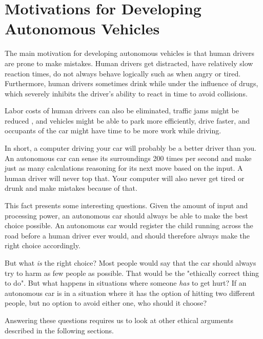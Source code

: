 \section{Motivations for Developing Autonomous Vehicles}
The main motivation for developing autonomous vehicles is that human drivers are prone to make mistakes. Human drivers get distracted, have relatively slow reaction times, do not always behave logically such as when angry or tired. Furthermore, human drivers sometimes drink while under the influence of drugs, which severely inhibits the driver's ability to react in time to avoid collisions. 

Labor costs of human drivers can also be eliminated, traffic jams might be reduced , and vehicles might be able to park more efficiently, drive faster, and occupants of the car might have time to be more work while driving. 

\newpar In short, a computer driving your car will probably be a better driver than you. An autonomous car can sense its surroundings 200 times per second and make just as many calculations reasoning for its next move based on the input. A human driver will never top that. Your computer will also never get tired or drunk and make mistakes because of that. 

This fact presents some interesting questions. Given the amount of input and processing power, an autonomous car should always be able to make the best choice possible. An autonomous car would register the child running across the road before a human driver ever would, and should therefore always make the right choice accordingly. 

\newpar But what \textit{is} the right choice? Most people would say that the car should always try to harm as few people as possible. That would be the "ethically correct thing to do". But what happens in situations where someone \textit{has} to get hurt? If an autonomous car is in a situation where it has the option of hitting two different people, but no option to avoid either one, who should it choose? 

Answering these questions requires us to look at other ethical arguments described in the following sections.   